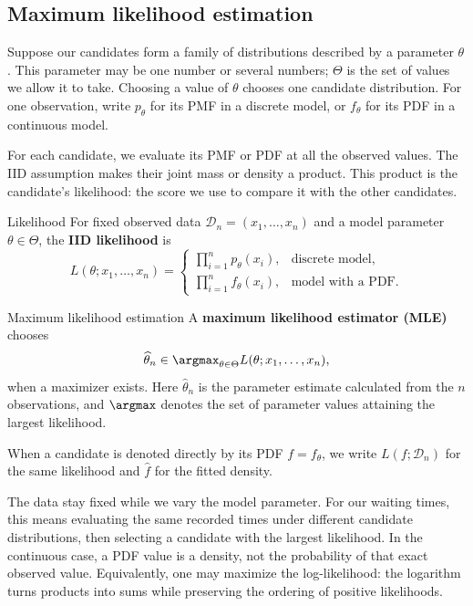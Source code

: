\documentclass[a4paper,12pt,oneside]{report}
\begin{document}
\subsection{Maximum likelihood estimation}
\label{sec:maximum-likelihood}

Suppose our candidates form a family of distributions described
by a parameter $\theta$. This parameter may be one number or
several numbers; $\Theta$ is the set of values we allow it to take.
Choosing a value of $\theta$ chooses one candidate distribution.
For one observation, write $p_\theta$ for its PMF in a discrete
model, or $f_\theta$ for its PDF in a continuous model.

For each candidate, we evaluate its PMF or PDF at all the observed
values. The IID assumption makes their joint mass or density a
product. This product is the candidate's likelihood: the score
we use to compare it with the other candidates.

\begin{frameddefn}{Likelihood}
\label{def:likelihood}
For fixed observed data $\mathcal D_n=(x_1,\ldots,x_n)$ and
a model parameter $\theta\in\Theta$, the \textbf{IID likelihood} is
\[
  L(\theta;x_1,\ldots,x_n)=
  \begin{cases}
    \displaystyle\prod_{i=1}^n p_\theta(x_i),
       & \text{discrete model},\\[6pt]
    \displaystyle\prod_{i=1}^n f_\theta(x_i),
       & \text{model with a PDF}.
  \end{cases}
\]
\end{frameddefn}

\begin{frameddefn}{Maximum likelihood estimation}
\label{def:maximum-likelihood}
A \textbf{maximum likelihood estimator (MLE)} chooses
\[
  \widehat\theta_n\in
  \argmax_{\theta\in\Theta}L(\theta;x_1,\ldots,x_n),
\]
when a maximizer exists. Here $\widehat\theta_n$ is the parameter
estimate calculated from the $n$ observations, and $\argmax$
denotes the set of parameter values attaining the largest
likelihood.
\end{frameddefn}

When a candidate is denoted directly by its PDF $f=f_\theta$,
we write $L(f;\mathcal D_n)$ for the same likelihood and
$\widehat f$ for the fitted density.

The data stay fixed while we vary the model parameter. For our
waiting times, this means evaluating the same recorded times
under different candidate distributions, then selecting a
candidate with the largest likelihood.
In the continuous case, a PDF value is a density, not the
probability of that exact observed value.
Equivalently, one may maximize the log-likelihood: the logarithm
turns products into sums while preserving the ordering of
positive likelihoods.
\end{document}
